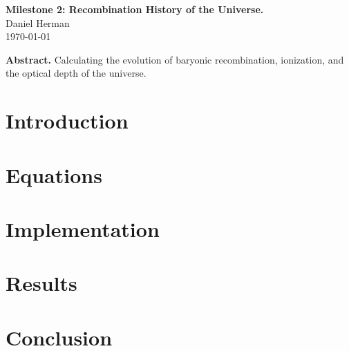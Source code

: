 \documentclass[a4paper]{article}
\begin{document}
\begin{center}
  {\Large \bf Milestone 2: Recombination History of the Universe.}\\[4ex]
  {\large Daniel Herman}\\[4ex]
  \normalsize
  \today
  \vspace*{2ex}
      
  \begin{minipage}[t]{15cm}
      
  {\bf Abstract. }Calculating the evolution of baryonic recombination, ionization, and the optical depth of the universe.
	
  \vspace*{2ex}
  \end{minipage}

\end{center}

\section{Introduction}\label{sec:intro}

\section{Equations}\label{sec:eq}

\section{Implementation}\label{sec:imp}

\section{Results}\label{sec:results}

\section{Conclusion}\label{sec:conc}
\end{document}
